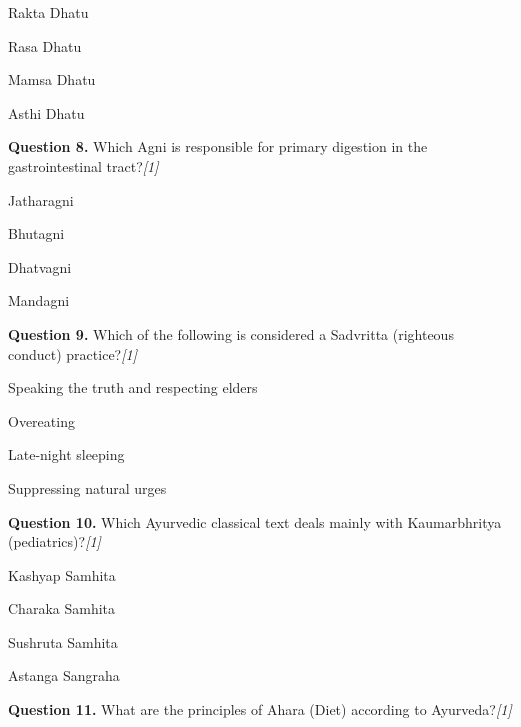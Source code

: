 \documentclass[11pt,a4paper]{article}
\newcommand{\pts}[1]{\hfill   \textit{[#1]}}
\begin{document}
\begin{parts}
  \item Rakta Dhatu
  \item Rasa Dhatu
  \item Mamsa Dhatu
  \item Asthi Dhatu
\end{parts}

\medskip




\noindent   \textbf{Question 8.} Which Agni is responsible for primary digestion in the gastrointestinal tract?\pts{1}

\begin{parts}
  \item Jatharagni
  \item Bhutagni
  \item Dhatvagni
  \item Mandagni
\end{parts}

\medskip




\noindent   \textbf{Question 9.} Which of the following is considered a Sadvritta (righteous conduct) practice?\pts{1}

\begin{parts}
  \item Speaking the truth and respecting elders
  \item Overeating
  \item Late-night sleeping
  \item Suppressing natural urges
\end{parts}

\medskip




\noindent   \textbf{Question 10.} Which Ayurvedic classical text deals mainly with Kaumarbhritya (pediatrics)?\pts{1}

\begin{parts}
  \item Kashyap Samhita
  \item Charaka Samhita
  \item Sushruta Samhita
  \item Astanga Sangraha
\end{parts}

\medskip




\noindent   \textbf{Question 11.} What are the principles of Ahara (Diet) according to Ayurveda?\pts{1}
\end{document}
